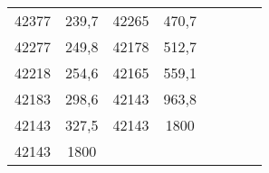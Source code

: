 \documentclass[11pt]{article}
\begin{document}
{{\begin{tabular}{|c|c|c|c|c|c|c|c|}
            42377 & 239,7 & 42265 & 470,7 & \multicolumn{1}{c}{} & \multicolumn{1}{c}{} & \multicolumn{1}{c}{} & \multicolumn{1}{c}{}\tabularnewline
            \cline{1-4} 
            42277 & 249,8 & 42178 & 512,7 & \multicolumn{1}{c}{} & \multicolumn{1}{c}{} & \multicolumn{1}{c}{} & \multicolumn{1}{c}{}\tabularnewline
            \cline{1-4} 
            42218 & 254,6 & 42165 & 559,1 & \multicolumn{1}{c}{} & \multicolumn{1}{c}{} & \multicolumn{1}{c}{} & \multicolumn{1}{c}{}\tabularnewline
            \cline{1-4} 
            42183 & 298,6 & 42143 & 963,8 & \multicolumn{1}{c}{} & \multicolumn{1}{c}{} & \multicolumn{1}{c}{} & \multicolumn{1}{c}{}\tabularnewline
            \cline{1-4} 
            42143 & 327,5 & 42143 & 1800 & \multicolumn{1}{c}{} & \multicolumn{1}{c}{} & \multicolumn{1}{c}{} & \multicolumn{1}{c}{}\tabularnewline
            \cline{1-4} 
            42143 & 1800 & \multicolumn{1}{c}{} & \multicolumn{1}{c}{} & \multicolumn{1}{c}{} & \multicolumn{1}{c}{} & \multicolumn{1}{c}{} & \multicolumn{1}{c}{}\tabularnewline
            \cline{1-2} 
        \end{tabular}
    }
}
\vspace*{\fill}
\end{document}
